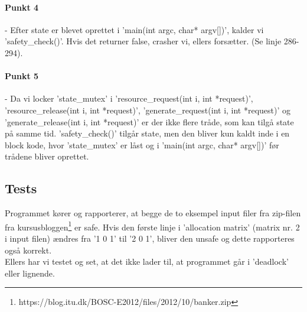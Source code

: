 \paragraph{Punkt 4} - Efter state er blevet oprettet i 'main(int argc, char* argv[])', kalder vi 'safety\_check()'. Hvis det returner false, crasher vi, ellers forsætter. (Se linje 286-294).
\paragraph{Punkt 5} - Da vi locker 'state\_mutex' i 'resource\_request(int i, int *request)', 'resource\_release(int i, int *request)', 'generate\_request(int i, int *request)' og 'generate\_release(int i, int *request)' er der ikke flere tråde, som kan tilgå state på samme tid. 'safety\_check()' tilgår state, men den bliver kun kaldt inde i en block kode, hvor 'state\_mutex' er låst og i 'main(int argc, char* argv[])' før trådene bliver oprettet.

\subsection{Tests}
\label{O4_Tests}
Programmet kører og rapporterer, at begge de to eksempel input filer fra zip-filen fra kursusbloggen\footnote{https://blog.itu.dk/BOSC-E2012/files/2012/10/banker.zip} er safe. Hvis den første linje i 'allocation matrix' (matrix nr. 2 i  input filen) ændres fra '1 0 1' til '2 0 1', bliver den unsafe og dette rapporteres også korrekt.
\\Ellers har vi testet og set, at det ikke lader til, at programmet går i 'deadlock' eller lignende.
